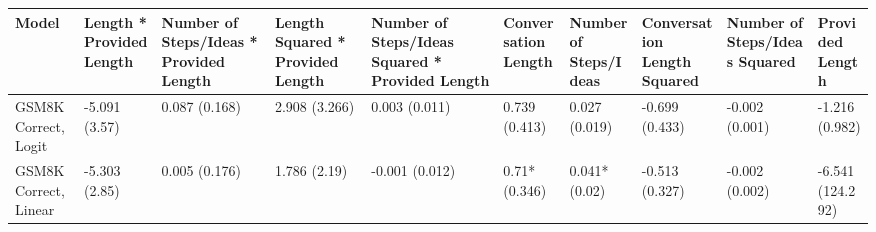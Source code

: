 \begin{tabular}{x{1.5cm}|x{0.75cm}|x{0.75cm}|x{0.75cm}|x{0.75cm}|x{0.75cm}|x{0.75cm}|x{0.75cm}|x{0.75cm}|x{0.75cm}}
\toprule
\hline
Model & Length * Provided Length & Number of Steps/Ideas * Provided Length & Length Squared * Provided Length & Number of Steps/Ideas Squared * Provided Length & Conversation Length & Number of Steps/Ideas & Conversation Length Squared & Number of Steps/Ideas Squared & Provided Length \\
\hline
\midrule
GSM8K Correct, Logit & -5.091 (3.57) & 0.087 (0.168) & 2.908 (3.266) & 0.003 (0.011) & 0.739 (0.413) & 0.027 (0.019) & -0.699 (0.433) & -0.002 (0.001) & -1.216 (0.982) \\
\hline
GSM8K Correct, Linear & -5.303 (2.85) & 0.005 (0.176) & 1.786 (2.19) & -0.001 (0.012) & 0.71* (0.346) & 0.041* (0.02) & -0.513 (0.327) & -0.002 (0.002) & -6.541 (124.292) \\
\hline
\bottomrule
\end{tabular}
